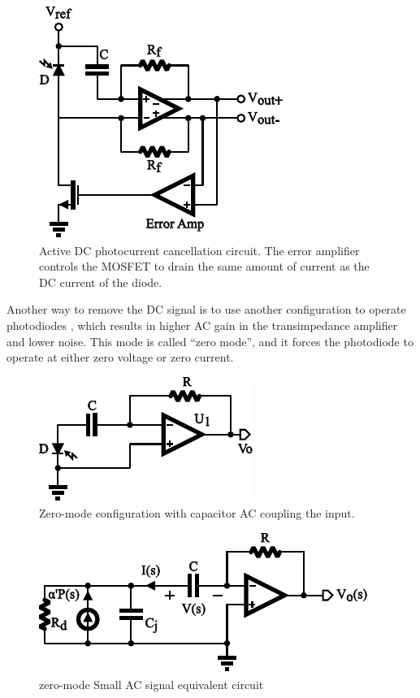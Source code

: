 \begin{figure}[h]
\centerline{\includegraphics[width=0.6\linewidth]{3-literature/IFeedbackSch.pdf}}
\caption{Active DC photocurrent cancellation circuit. The error amplifier controls the MOSFET to drain the same amount of current as the DC current of the diode.}
\label{fig_IFeedbackSch}
\end{figure}

Another way to remove the DC signal is to use another configuration to operate photodiodes \cite{zero-mode_detection}, which results in higher AC gain in the transimpedance amplifier and lower noise.  This mode is called “zero mode”, and it forces the photodiode to operate at either zero voltage or zero current.  

\begin{figure}[h]
\centerline{\includegraphics[width=0.6\linewidth]{zero_mode_sch.pdf}}
\caption{Zero-mode configuration with capacitor AC coupling the input.}
\label{fig_zero_mode_sch}
\end{figure}

\begin{figure}[h]
\centerline{\includegraphics[width=0.8\linewidth]{3-literature/ZeroModeSS.pdf}}
\caption{zero-mode Small AC signal equivalent circuit}
\label{fig_ZeroModeSS}
\end{figure}

